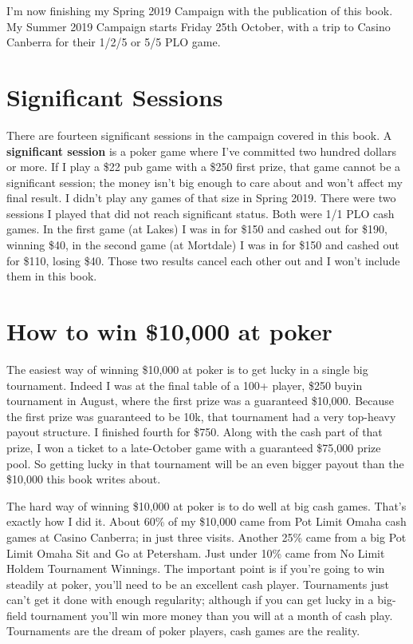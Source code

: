 I'm now finishing my Spring 2019 Campaign with the publication of this
book. My Summer 2019 Campaign starts Friday 25th October, with a trip
to Casino Canberra for their 1/2/5 or 5/5 PLO game.

\section*{Significant Sessions}


There are fourteen significant sessions in the campaign covered in this
book. A \textbf{significant session} is a poker game where I've
committed two hundred dollars or more. If I play a \$22 pub game with
a \$250 first prize, that game cannot be a significant session; the
money isn't big enough to care about and won't affect my final
result. I didn't play any games of that size in Spring 2019. There
were two sessions I played that did not reach significant status. Both
were 1/1 PLO cash games. In the first game (at Lakes) I was in for
\$150 and cashed out for \$190, winning \$40, in the second game
(at Mortdale) I was in for \$150 and cashed out for \$110, losing
\$40. Those two results cancel each other out and I won't include them
in this book.


\section*{How to win \$10,000 at poker}

The easiest way of winning \$10,000 at poker is to get lucky in a
single big tournament. Indeed I was at the final table of a 100+
player, \$250 buyin tournament in August, where the first prize was a
guaranteed \$10,000. Because the first prize was guaranteed to be 10k,
that tournament had a very top-heavy payout structure. I finished
fourth for \$750. Along with the cash part of that prize, I won a
ticket to a late-October game with a guaranteed \$75,000 prize
pool. So getting lucky in that tournament will be an even bigger
payout than the \$10,000 this book writes about.

The hard way of winning \$10,000 at poker is to do well at big cash
games. That's exactly how I did it. About 60\% of my \$10,000 came
from Pot Limit Omaha cash games at Casino Canberra; in just three
visits. Another 25\% came from a big Pot Limit Omaha Sit and Go at
Petersham. Just under 10\% came from No Limit Holdem Tournament
Winnings. The important point is if you're going to win steadily at
poker, you'll need to be an excellent cash player. Tournaments just
can't get it done with enough regularity; although if you can get
lucky in a big-field tournament you'll win more money than you will at
a month of cash play. Tournaments are the dream of poker players, cash
games are the reality.

